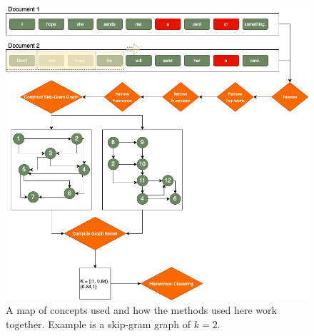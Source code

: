 \begin{figure}
 \includegraphics[width=6in]{Content/Images/Concept_map.png}
 \caption{A map of concepts used and how the methods used here work together. Example is a skip-gram graph of $k=2$.}
 \end{figure}


